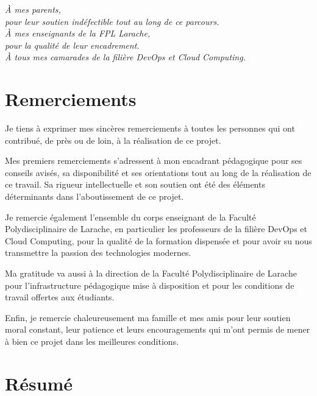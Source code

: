 \documentclass[12pt,a4paper,oneside]{report}
\begin{document}
\clearpage

\thispagestyle{empty}
\vspace*{5cm}
\begin{flushright}
  \itshape
  À mes parents,\\
  pour leur soutien indéfectible tout au long de ce parcours.\\[1em]
  À mes enseignants de la FPL Larache,\\
  pour la qualité de leur encadrement.\\[1em]
  À tous mes camarades de la filière DevOps et Cloud Computing.
\end{flushright}
\clearpage

\chapter*{Remerciements}
\thispagestyle{fancy}

Je tiens à exprimer mes sincères remerciements à toutes les personnes qui ont contribué, de près ou de loin, à la réalisation de ce projet.

Mes premiers remerciements s'adressent à mon encadrant pédagogique pour ses conseils avisés, sa disponibilité et ses orientations tout au long de la réalisation de ce travail. Sa rigueur intellectuelle et son soutien ont été des éléments déterminants dans l'aboutissement de ce projet.

Je remercie également l'ensemble du corps enseignant de la Faculté Polydisciplinaire de Larache, en particulier les professeurs de la filière DevOps et Cloud Computing, pour la qualité de la formation dispensée et pour avoir su nous transmettre la passion des technologies modernes.

Ma gratitude va aussi à la direction de la Faculté Polydisciplinaire de Larache pour l'infrastructure pédagogique mise à disposition et pour les conditions de travail offertes aux étudiants.

Enfin, je remercie chaleureusement ma famille et mes amis pour leur soutien moral constant, leur patience et leurs encouragements qui m'ont permis de mener à bien ce projet dans les meilleures conditions.

\clearpage

\chapter*{Résumé}
\thispagestyle{fancy}
\end{document}
